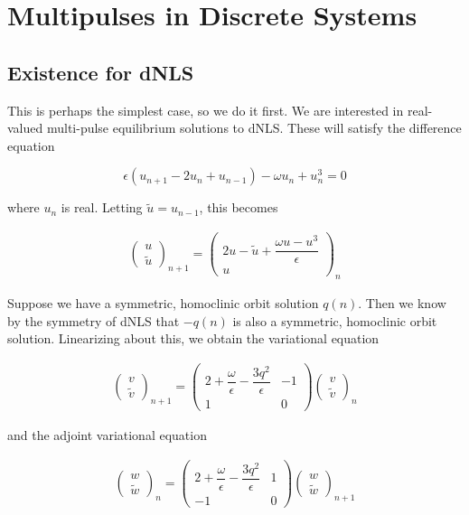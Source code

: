 \documentclass[12pt]{article}
\begin{document}
\section{Multipulses in Discrete Systems}

\subsection{Existence for dNLS}

This is perhaps the simplest case, so we do it first. We are interested in real-valued multi-pulse equilibrium solutions to dNLS. These will satisfy the difference equation

\[
\epsilon(u_{n+1} - 2 u_n + u_{n-1}) - \omega u_n + u_n^3 = 0
\]

where $u_n$ is real. Letting $\tilde{u} = u_{n-1}$, this becomes

\begin{align*}
\begin{pmatrix}u \\ \tilde{u} \end{pmatrix}_{n+1} =
\begin{pmatrix}2 u - \tilde{u} + \dfrac{\omega u - u^3}{\epsilon} \\ u \end{pmatrix}_n
\end{align*}

Suppose we have a symmetric, homoclinic orbit solution $q(n)$. Then we know by the symmetry of dNLS that $-q(n)$ is also a symmetric, homoclinic orbit solution. Linearizing about this, we obtain the variational equation

\begin{align*}
\begin{pmatrix}v \\ \tilde{v}\end{pmatrix}_{n+1} =
\begin{pmatrix}2 + \dfrac{\omega}{\epsilon} - \dfrac{3q^2}{\epsilon} & -1  \\
1 & 0 \end{pmatrix}
\begin{pmatrix}v \\ \tilde{v}\end{pmatrix}_n
\end{align*}

and the adjoint variational equation

\begin{align*}
\begin{pmatrix}w \\ \tilde{w} \end{pmatrix}_n =
\begin{pmatrix}2 + \dfrac{\omega}{\epsilon} - \dfrac{3q^2}{\epsilon} & 1  \\
-1 & 0 \end{pmatrix}
\begin{pmatrix}w \\ \tilde{w} \end{pmatrix}_{n+1}
\end{align*}
\end{document}
